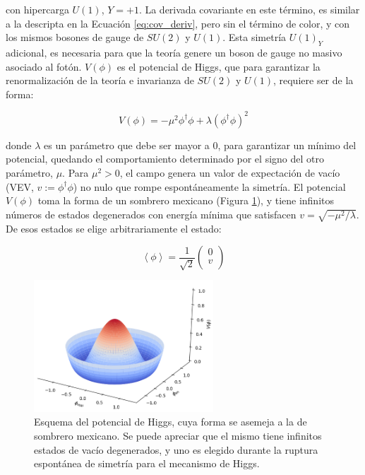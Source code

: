 \noindent
con hipercarga $U(1)$, $Y=+1$. La derivada covariante en este término, es similar a la descripta en la Ecuación \ref{eq:cov_deriv}, pero sin el término de color, y con los mismos bosones de gauge de $SU(2)$ y $U(1)$. Esta simetría $U(1)_Y$ adicional, es necesaria para que la teoría genere un boson de gauge no masivo asociado al fotón.
$V(\phi)$ es el potencial de Higgs, que para garantizar la renormalización de la teoría e invarianza de $SU(2)$ y $U(1)$, requiere ser de la forma:

\begin{equation}
	V(\phi) = - \mu^{2}\phi^{\dagger}\phi + \lambda(\phi^{\dagger}\phi)^{2}
	\label{eq:higgs_pot}
\end{equation}

\noindent
donde $\lambda$ es un parámetro que debe ser mayor a $0$, para garantizar un mínimo del potencial, quedando el comportamiento determinado por el signo del otro parámetro, $\mu$. Para $\mu^2>0$, el campo genera un valor de expectación de vacío (VEV, $v:=\phi^{\dagger}\phi$) no nulo que rompe espontáneamente la simetría. El potencial $V(\phi)$ toma la forma de un sombrero mexicano (Figura \ref{fig:mexican_hat}), y tiene infinitos números de estados degenerados con energía mínima que satisfacen $v = \sqrt{-\mu^2/\lambda}$. De esos estados se elige arbitrariamente el estado:

\begin{equation}
	\left<\phi\right> = \frac{1}{\sqrt{2}}
	\begin{pmatrix}
	0 \\
	v \\
	\end{pmatrix}
\end{equation}

\begin{figure}
  \centering
  \includegraphics[width=0.6\textwidth]{images/theory/mexican_hat.png}
  \caption{Esquema del potencial de Higgs, cuya forma se asemeja a la de sombrero mexicano. Se puede apreciar que el mismo tiene infinitos estados de vacío degenerados, y uno es elegido durante la ruptura espontánea de simetría para el mecanismo de Higgs.}
  \label{fig:mexican_hat}
\end{figure}

